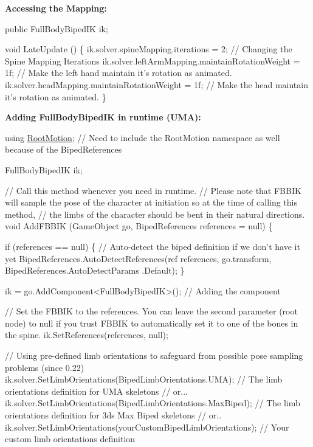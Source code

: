 {\bfseries Accessing the Mapping\+:}


\begin{DoxyCode}
\textcolor{keyword}{public} FullBodyBipedIK ik;

\textcolor{keywordtype}{void} LateUpdate () \{
    ik.solver.spineMapping.iterations = 2; \textcolor{comment}{// Changing the Spine Mapping Iterations}
    ik.solver.leftArmMapping.maintainRotationWeight = 1f; \textcolor{comment}{// Make the left hand maintain it's rotation as
       animated.}
    ik.solver.headMapping.maintainRotationWeight = 1f; \textcolor{comment}{// Make the head maintain it's rotation as animated.}
\}
\end{DoxyCode}


{\bfseries Adding Full\+Body\+Biped\+IK in runtime (U\+MA)\+:} 
\begin{DoxyCode}
\textcolor{keyword}{using} \mbox{\hyperlink{namespace_root_motion}{RootMotion}}; \textcolor{comment}{// Need to include the RootMotion namespace as well because of the
       BipedReferences}

FullBodyBipedIK ik;

\textcolor{comment}{// Call this method whenever you need in runtime. }
\textcolor{comment}{// Please note that FBBIK will sample the pose of the character at initiation so at the time of calling
       this method,}
\textcolor{comment}{// the limbs of the character should be bent in their natural directions.}
\textcolor{keywordtype}{void} AddFBBIK (GameObject go, BipedReferences references = null) \{

    \textcolor{keywordflow}{if} (references == null) \{ \textcolor{comment}{// Auto-detect the biped definition if we don't have it yet}
        BipedReferences.AutoDetectReferences(ref references, go.transform, BipedReferences.AutoDetectParams
      .Default);
    \}

    ik = go.AddComponent<FullBodyBipedIK>(); \textcolor{comment}{// Adding the component}

    \textcolor{comment}{// Set the FBBIK to the references. You can leave the second parameter (root node) to null if you trust
       FBBIK to automatically set it to one of the bones in the spine.}
    ik.SetReferences(references, null);

    \textcolor{comment}{// Using pre-defined limb orientations to safeguard from possible pose sampling problems (since 0.22)}
    ik.solver.SetLimbOrientations(BipedLimbOrientations.UMA); \textcolor{comment}{// The limb orientations definition for UMA
       skeletons}
    \textcolor{comment}{// or...}
    ik.solver.SetLimbOrientations(BipedLimbOrientations.MaxBiped); \textcolor{comment}{// The limb orientations definition for
       3ds Max Biped skeletons}
    \textcolor{comment}{// or..}
    ik.solver.SetLimbOrientations(yourCustomBipedLimbOrientations); \textcolor{comment}{// Your custom limb orientations
       definition}


\end{DoxyCode}
